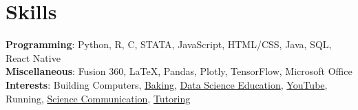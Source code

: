 \documentclass[letterpaper,11pt]{article}
\begin{document}
\section{Skills}
 \begin{itemize}[leftmargin=0.15in, label={}]
    \small{\item{
     \textbf{Programming}{: Python, R, C, STATA, JavaScript, HTML/CSS, Java, SQL, React Native} \\
     \textbf{Miscellaneous}{: Fusion 360, \LaTeX, Pandas, Plotly, TensorFlow, Microsoft Office}
    } \\
     \textbf{Interests}{: Building Computers, \href{https://www.instagram.com/whedgehogbaking/}{Baking}, \href{https://socialsciences.uchicago.edu/news/data4all-workshop-introduces-high-school-students-data-science-research}{Data Science Education}, \href{https://www.youtube.com/channel/UCub38TXhT_RZkwLwyXtTpaA}{YouTube}, Running, \href{https://tthspectrum.org/articles/organic-electronics-sustainable-storage-renewable-energy/}{Science Communication}, \href{https://pioneeroptimist.com/2072/news/pioneer-offers-various-tutoring-programs-for-students/}{Tutoring}}
    }
    
 \end{itemize}


\end{document}
